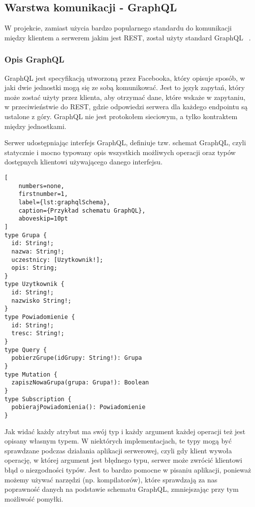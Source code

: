 \subsection{Warstwa komunikacji - GraphQL}
W projekcie, zamiast użycia bardzo popularnego standardu do komunikacji między klientem a serwerem jakim jest REST, został użyty standard GraphQL ~\cite{ref_graphql_doc}.

\subsubsection{Opis GraphQL}
GraphQL jest specyfikacją utworzoną przez Facebooka, który opisuje sposób, w jaki dwie jednostki mogą się ze sobą komunikować. Jest to język zapytań, który może zostać użyty przez klienta, aby otrzymać dane, które wskaże w zapytaniu, w przeciwieństwie do REST, gdzie odpowiedzi serwera dla każdego endpointu są ustalone z góry. GraphQL nie jest protokołem sieciowym, a tylko kontraktem między jednostkami.

Serwer udostępniając interfejs GraphQL, definiuje tzw. schemat GraphQL, czyli statycznie i mocno typowany opis wszystkich możliwych operacji oraz typów dostępnych klientowi używającego danego interfejsu.

\begin{addmargin}[6mm]{0mm}
\begin{lstlisting}[
    numbers=none,
    firstnumber=1,
    label={lst:graphqlSchema},
    caption={Przykład schematu GraphQL},
    aboveskip=10pt
]
type Grupa {
  id: String!;
  nazwa: String!;
  uczestnicy: [Uzytkownik!];
  opis: String;
}
type Uzytkownik {
  id: String!;
  nazwisko String!;
}
type Powiadomienie {
  id: String!;
  tresc: String!;
}
type Query {
  pobierzGrupe(idGrupy: String!): Grupa
}
type Mutation {
  zapiszNowaGrupa(grupa: Grupa!): Boolean
}
type Subscription {
  pobierajPowiadomienia(): Powiadomienie
}
\end{lstlisting}
\end{addmargin}
Jak widać każdy atrybut ma swój typ i każdy argument każdej operacji też jest opisany własnym typem. W niektórych implementacjach, te typy mogą być sprawdzane podczas działania aplikacji serwerowej, czyli gdy klient wywoła operację, w której argument jest błędnego typu, serwer może zwrócić klientowi błąd o niezgodności typów. Jest to bardzo pomocne w pisaniu aplikacji, ponieważ możemy używać narzędzi (np. kompilatorów), które sprawdzają za nas poprawność danych na podstawie schematu GraphQL, zmniejszając przy tym możliwość pomyłki.

